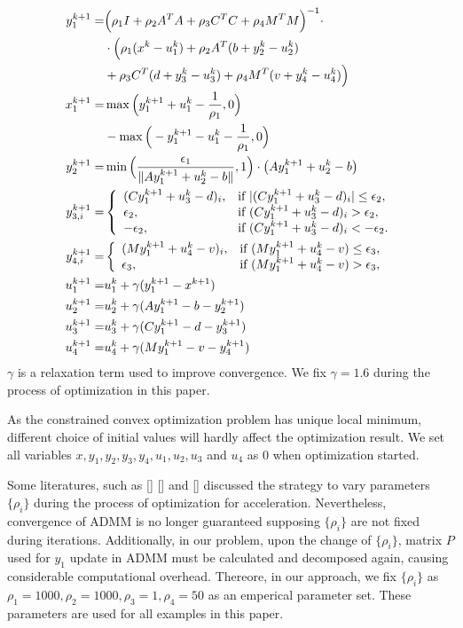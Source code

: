 \documentclass[annual]{acmsiggraph}
\begin{document}
\begin{align}
y_1^{k+1}=&\Big( \rho_1 I+ \rho_2 A^TA+ \rho_3 C^TC+ \rho_4 M^TM\Big)^{-1}\cdot\notag\\
&\cdot\Big(\rho_1 (x^k-u_1^k)+\rho_2 A^T(b+y_2^k-u_2^k)\notag\\ &+ \rho_3 C^T(d+y_3^k-u_3^k)+\rho_4 M^T(v+y_4^k-u_4^k)\Big)\\
x_1^{k+1}=&\max\Big(y_1^{k+1}+u_1^k-\frac{1}{\rho_1}, 0\Big) \notag\\&- \max\Big(-y_1^{k+1}-u_1^k-\frac{1}{\rho_1}, 0\Big)\\
y_2^{k+1}=&\min\Big(\frac{\epsilon_1}{\|Ay_1^{k+1}+u_2^k-b\|},1\Big)\cdot\big(Ay_1^{k+1}+u_2^k-b\big)\\
y_{3,i}^{k+1}=&\left\{
\begin{array}{ll}
(Cy_1^{k+1}+u_3^k-d)_i, &\mbox{if }|(Cy_1^{k+1}+u_3^k-d)_i|\leq\epsilon_2,\\
\epsilon_2, &\mbox{if }(Cy_1^{k+1}+u_3^k-d)_i>\epsilon_2,\\
-\epsilon_2, &\mbox{if }(Cy_1^{k+1}+u_3^k-d)_i<-\epsilon_2.\\
\end{array}
\right.\\
y_{4,i}^{k+1}=&\left\{
\begin{array}{ll}
(My_1^{k+1}+u_4^k-v)_i, &\mbox{if }(My_1^{k+1}+u_4^k-v)\leq\epsilon_3,\\
\epsilon_3, &\mbox{if }(My_1^{k+1}+u_4^k-v)>\epsilon_3,\\
\end{array}
\right.\\
u_1^{k+1}=&u_1^k+\gamma(y_1^{k+1}-x^{k+1})\\
u_2^{k+1}=&u_2^k+\gamma(Ay_1^{k+1}-b-y_2^{k+1})\\
u_3^{k+1}=&u_3^k+\gamma(Cy_1^{k+1}-d-y_3^{k+1})\\
u_4^{k+1}=&u_4^k+\gamma(My_1^{k+1}-v-y_4^{k+1})
\end{align}
$\gamma$ is a relaxation term used to improve convergence. We fix $\gamma=1.6$ during the process of optimization in this paper. 

As the constrained convex optimization problem has unique local minimum, different choice of initial values will hardly affect the optimization result. We set all variables $x, y_1, y_2, y_3, y_4, u_1, u_2, u_3$ and $u_4$ as 0 when optimization started. 

Some literatures, such as [] [] and [] discussed the strategy to vary parameters $\{\rho_i\}$ during the process of optimization for acceleration. Nevertheless, convergence of ADMM is no longer guaranteed supposing $\{\rho_i\}$ are not fixed during iterations. Additionally, in our problem, upon the change of $\{\rho_i\}$, matrix $P$ used for $y_1$ update in ADMM must be calculated and decomposed again, causing considerable computational overhead. Thereore, in our approach, we fix $\{\rho_i\}$ as $\rho_1=1000, \rho_2=1000, \rho_3=1, \rho_4=50$ as an emperical parameter set. These parameters are used for all examples in this paper.


\end{document}
